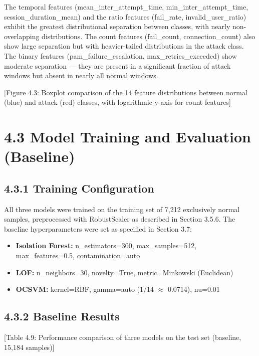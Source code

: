 \documentclass[
  a4paper]{report}
\providecommand{\tightlist}{%
  \setlength{\itemsep}{0pt}\setlength{\parskip}{0pt}}
\begin{document}
The temporal features (mean\_inter\_attempt\_time,
min\_inter\_attempt\_time, session\_duration\_mean) and the ratio
features (fail\_rate, invalid\_user\_ratio) exhibit the greatest
distributional separation between classes, with nearly non-overlapping
distributions. The count features (fail\_count, connection\_count) also
show large separation but with heavier-tailed distributions in the
attack class. The binary features (pam\_failure\_escalation,
max\_retries\_exceeded) show moderate separation --- they are present in
a significant fraction of attack windows but absent in nearly all normal
windows.

{[}Figure 4.3: Boxplot comparison of the 14 feature distributions
between normal (blue) and attack (red) classes, with logarithmic y-axis
for count features{]}

\section{4.3 Model Training and Evaluation
(Baseline)}\label{model-training-and-evaluation-baseline}

\subsection{4.3.1 Training Configuration}\label{training-configuration}

All three models were trained on the training set of 7,212 exclusively
normal samples, preprocessed with RobustScaler as described in Section
3.5.6. The baseline hyperparameters were set as specified in Section
3.7:

\begin{itemize}
\tightlist
\item
  \textbf{Isolation Forest:} n\_estimators=300, max\_samples=512,
  max\_features=0.5, contamination=auto
\item
  \textbf{LOF:} n\_neighbors=30, novelty=True, metric=Minkowski
  (Euclidean)
\item
  \textbf{OCSVM:} kernel=RBF, gamma=auto (1/14 \(\approx\) 0.0714),
  nu=0.01
\end{itemize}

\subsection{4.3.2 Baseline Results}\label{baseline-results}

{[}Table 4.9: Performance comparison of three models on the test set
(baseline, 15,184 samples){]}
\end{document}
